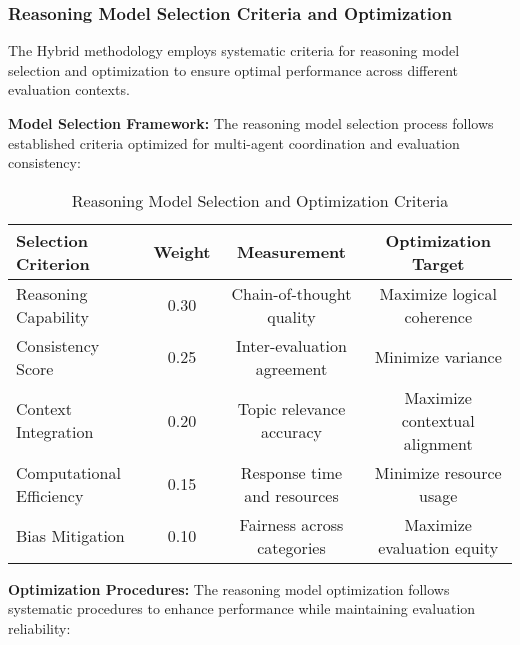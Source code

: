 \subsubsection{Reasoning Model Selection Criteria and Optimization}

The Hybrid methodology employs systematic criteria for reasoning model selection and optimization to ensure optimal performance across different evaluation contexts.

\textbf{Model Selection Framework:}
The reasoning model selection process follows established criteria optimized for multi-agent coordination and evaluation consistency:

\begin{table}[H]
\centering
\caption[Reasoning Model Selection Criteria]{Reasoning Model Selection and Optimization Criteria}
\label{tab:reasoning-model-selection}
\begin{tabular}{lccc}
\toprule
\textbf{Selection Criterion} & \textbf{Weight} & \textbf{Measurement} & \textbf{Optimization Target} \\
\midrule
Reasoning Capability & 0.30 & Chain-of-thought quality & Maximize logical coherence \\
Consistency Score & 0.25 & Inter-evaluation agreement & Minimize variance \\
Context Integration & 0.20 & Topic relevance accuracy & Maximize contextual alignment \\
Computational Efficiency & 0.15 & Response time and resources & Minimize resource usage \\
Bias Mitigation & 0.10 & Fairness across categories & Maximize evaluation equity \\
\bottomrule
\end{tabular}
\end{table}

\textbf{Optimization Procedures:}
The reasoning model optimization follows systematic procedures to enhance performance while maintaining evaluation reliability:

